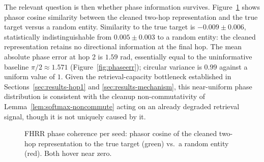 \documentclass[11pt]{article}
\theoremstyle{definition}
\begin{document}
The relevant question is then whether phase information survives.
Figure~\ref{fig:coherence} shows phasor cosine similarity between the cleaned
two-hop representation and the true target versus a random entity. Similarity
to the true target is $-0.009 \pm 0.006$, statistically indistinguishable from
$0.005 \pm 0.003$ to a random entity: the cleaned representation retains no
directional information at the final hop. The mean absolute phase error at hop
2 is $1.59$ rad, essentially equal to the uninformative baseline
$\pi/2 \approx 1.571$ (Figure~\ref{fig:phaseerr}); circular variance is $0.99$
against a uniform value of $1$. Given the retrieval-capacity bottleneck
established in Sections~\ref{sec:results-hop1} and \ref{sec:results-mechanism},
this near-uniform phase distribution is consistent with the cleanup
non-commutativity of Lemma~\ref{lem:softmax-noncommute} acting on an already
degraded retrieval signal, though it is not uniquely caused by it.

\begin{figure}[H]
\centering
{}
\caption{FHRR phase coherence per seed: phasor cosine of the cleaned two-hop
representation to the true target (green) vs.\ a random entity (red). Both hover
near zero.}
\label{fig:coherence}
\end{figure}
\end{document}
